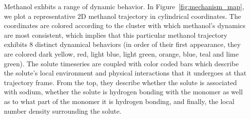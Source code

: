 \documentclass{article}
\begin{document}
  Methanol exhbits a range of dynamic behavior. In Figure~\ref{fig:mechanism_map}, we
  plot a representative 2D methanol trajectory in cylindrical coordinates. The coordinates
  are colored according to the cluster with which methanol's dynamics are most consistent,
  which implies that this particular methanol trajectory exhibits 8 distinct dynamical 
  behaviors (in order of their first appearance, they are colored dark yellow, red, light
  blue, light green, orange, blue, teal and lime green). The solute timeseries are coupled
  with color coded bars which describe the solute's local environment and physical 
  interactions that it undergoes at that trajectory frame. From the top, they describe 
  whether the solute is associated with sodium, whether the solute is hydrogen bonding
  with the monomer as well as to what part of the monomer it is hydrogen bonding, and 
  finally, the local number density surrounding the solute. 
\end{document}

